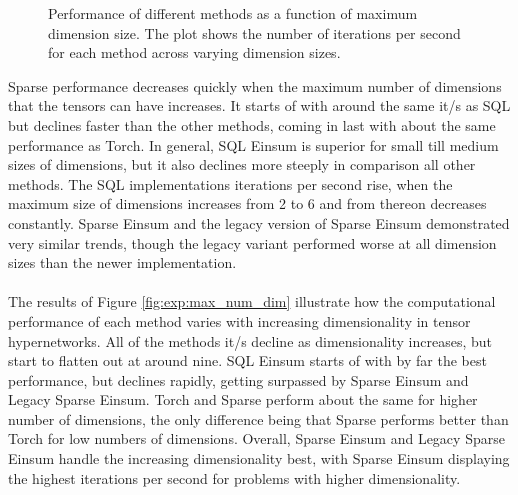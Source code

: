 \begin{figure}[H]
    \caption{Performance of different methods as a function of maximum dimension size. The plot shows the number of iterations per second for each method across varying dimension sizes.}
    \label{fig:exp:max_dim_size}
\end{figure}

\noindent
Sparse performance decreases quickly when the maximum number of dimensions that the tensors 
can have increases. It starts of with around the same it/s as SQL but declines faster than 
the other methods, coming in last with about the same performance as Torch. In general, 
SQL Einsum is superior for small till medium sizes of dimensions, but it also declines more 
steeply in comparison all other methods. The SQL implementations iterations per second rise, 
when the maximum size of dimensions increases from 2 to 6 and from thereon decreases constantly. 
Sparse Einsum and the legacy version of Sparse Einsum demonstrated very similar trends, 
though the legacy variant performed worse at all dimension sizes than the newer implementation. 
\\
\\
The results of Figure \ref{fig:exp:max_num_dim} illustrate how the computational performance 
of each method varies with increasing dimensionality in tensor hypernetworks. All of the methods
it/s decline as dimensionality increases, but start to flatten out at around nine. SQL Einsum 
starts of with by far the best performance, but declines rapidly, getting surpassed by Sparse Einsum 
and Legacy Sparse Einsum. Torch and Sparse perform about the same for higher number of dimensions, 
the only difference being that Sparse performs better than Torch for low numbers of dimensions. 
Overall, Sparse Einsum and Legacy Sparse Einsum handle the increasing dimensionality best, with 
Sparse Einsum displaying the highest iterations per second for problems with higher dimensionality. 


